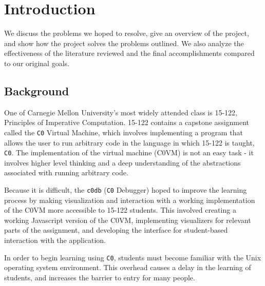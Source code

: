 \documentclass[11pt]{article}
\begin{document}
\section{Introduction}
We discuss the problems we hoped to resolve, give an overview of the project,
and show how the project solves the problems outlined. We also analyze the
effectiveness of the literature reviewed and the final accomplishments compared
to our original goals.
\subsection{Background}
One of Carnegie Mellon University's most widely attended class is 15-122,
Principles of Imperative Computation. 15-122 contains a capstone assignment
called the {\tt C0} Virtual Machine, which involves implementing a program that
allows the user to run arbitrary code in the language in which 15-122 is
taught, {\tt C0}. The implementation of the virtual machine (C0VM) is not an
easy task - it involves higher level thinking and a deep understanding of the
abstractions associated with running arbitrary code.
\par
Because it is difficult, the {\tt c0db} ({\tt C0} Debugger) hoped to improve
the learning process by making visualization and interaction with a working
implementation of the C0VM more accessible to 15-122 students. This involved
creating a working Javascript version of the C0VM, implementing visualizers for
relevant parts of the assignment, and developing the interface for
student-based interaction with the application.
\par
In order to begin learning using {\tt C0}, students must
become familiar with the Unix operating system environment. This overhead
causes a delay in the learning of students, and increases the barrier to entry
for many people.
\end{document}

